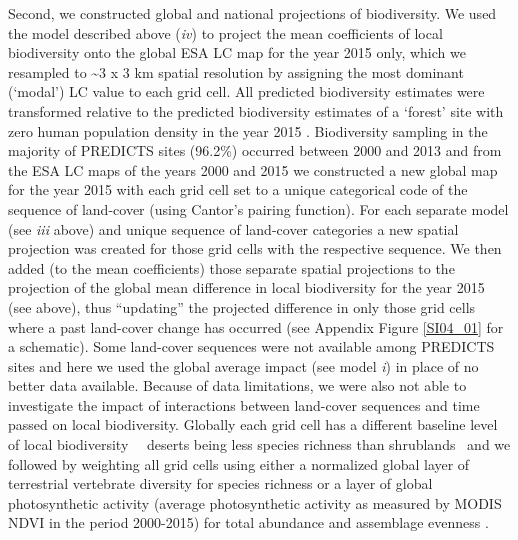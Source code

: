 Second, we constructed global and national projections of biodiversity. We used the model described above (\textit{iv}) to project the mean coefficients of local biodiversity onto the global ESA LC map for the year 2015 only, which we resampled to \textasciitilde3 x 3 km spatial resolution by assigning the most dominant (‘modal’) LC value to each grid cell. All predicted biodiversity estimates were transformed relative to the predicted biodiversity estimates of a ‘forest’ site with zero human population density in the year 2015 \citep{Newbold2015}. Biodiversity sampling in the majority of PREDICTS sites (96.2\%) occurred between 2000 and 2013 and from the ESA LC maps of the years 2000 and 2015 we constructed a new global map for the year 2015 with each grid cell set to a unique categorical code of the sequence of land-cover (using Cantor’s pairing function). For each separate model (see \textit{iii} above) and unique sequence of land-cover categories a new spatial projection was created for those grid cells with the respective sequence. We then added (to the mean coefficients) those separate spatial projections to the projection of the global mean difference in local biodiversity for the year 2015 (see above), thus “updating” the projected difference in only those grid cells where a past land-cover change has occurred (see Appendix Figure \ref{SI04_01} for a schematic). Some land-cover sequences were not available among PREDICTS sites and here we used the global average impact (see model \textit{i}) in place of no better data available. Because of data limitations, we were also not able to investigate the impact of interactions between land-cover sequences and time passed on local biodiversity. Globally each grid cell has a different baseline level of local biodiversity \textendash\ \eg\ deserts being less species richness than shrublands \textendash\ and we followed \cite{Newbold2015} by weighting all grid cells using either a normalized global layer of terrestrial vertebrate diversity \citep[summed range-of-occurrence maps for bird, mammal and amphibian species,][]{NatureServe2012,IUCN2016a} for species richness or a layer of global photosynthetic activity (average photosynthetic activity as measured by MODIS NDVI in the period 2000-2015) for total abundance and assemblage evenness \citep{Newbold2015}. 

